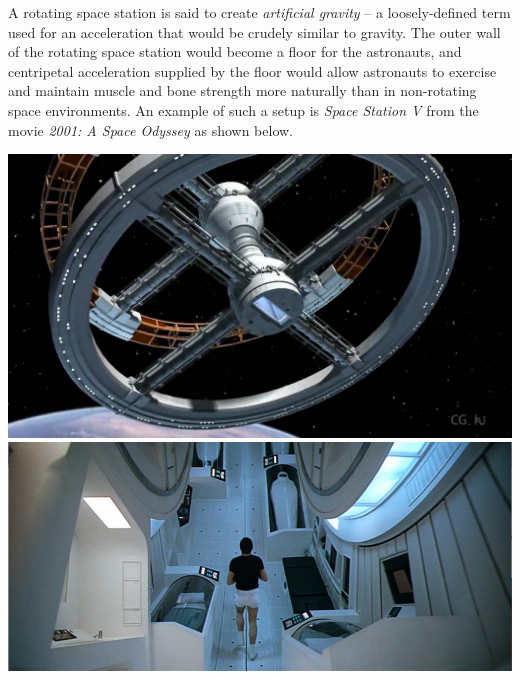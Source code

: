\documentclass[letterpaper,addpoints,answers]{exam}
\begin{document}
\begin{questions}
\begin{question}
A rotating space station is said to create \emph{artificial gravity} -- a loosely-defined term used for an acceleration that would be crudely similar to gravity. The outer wall of the rotating space station would become a floor for the astronauts, and centripetal acceleration supplied by the floor would allow astronauts to exercise and maintain muscle and bone strength more naturally than in non-rotating space environments. An example of such a setup is \emph{Space Station V} from the movie \emph{2001: A Space Odyssey} as shown below.
\begin{center}
\includegraphics[height=0.16\textheight]{2001-space-station-V} \includegraphics[height=0.16\textheight]{2001-discovery-interior}
\end{center}
\end{question}
\end{questions}
\end{document}
